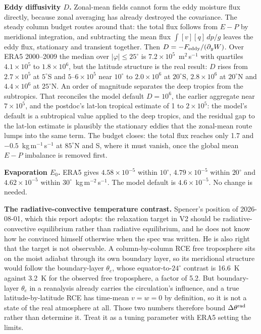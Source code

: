 \documentclass[11pt]{article}
\newcommand{\py}{\partial_y}
\begin{document}
\textbf{Eddy diffusivity $D$.} Zonal-mean fields cannot form the eddy moisture
flux directly, because zonal averaging has already destroyed the covariance.
The steady column budget routes around that: the total flux follows from
$E - P$ by meridional integration, and subtracting the mean flux
$\int [v][q]\,dp/g$ leaves the eddy flux, stationary and transient together.
Then $D = -F_{\rm eddy}/(\py W)$. Over ERA5 2000--2009 the median over
$|\varphi|\le25^\circ$ is $7.2\times10^{5}$~m$^2$\,s$^{-1}$ with quartiles
$4.1\times10^{5}$ to $1.8\times10^{6}$, but the latitude structure is the real
result: $D$ rises from $2.7\times10^{5}$ at $5^\circ$S and
$5$--$6\times10^{5}$ near $10^\circ$ to $2.0\times10^{6}$ at $20^\circ$S,
$2.8\times10^{6}$ at $20^\circ$N and $4.4\times10^{6}$ at $25^\circ$N. An order
of magnitude separates the deep
tropics from the subtropics. That reconciles the model default $D = 10^{6}$,
the earlier aggregate near $7\times10^{5}$, and the postdoc's lat-lon tropical
estimate of 1 to $2\times10^{5}$: the model's default is a subtropical value
applied to the deep tropics, and the residual gap to the lat-lon estimate is
plausibly the stationary eddies that the zonal-mean route lumps into the same
term. The budget closes: the total flux reaches only 1.7 and
$-0.5$~kg\,m$^{-1}$\,s$^{-1}$ at $85^\circ$N and S, where it must vanish, once
the global mean $E-P$ imbalance is removed first.

\textbf{Evaporation $E_0$.} ERA5 gives $4.58\times10^{-5}$ within $10^\circ$,
$4.79\times10^{-5}$ within $20^\circ$ and $4.62\times10^{-5}$ within
$30^\circ$~kg\,m$^{-2}$\,s$^{-1}$. The model default is
$4.6\times10^{-5}$. No change is needed.

\textbf{The radiative-convective temperature contrast.} Spencer's position of
2026-08-01, which this report adopts: the relaxation target in V2 should be
radiative-convective equilibrium rather than radiative equilibrium, and he does
not know how he convinced himself otherwise when the spec was written. He is
also right that the target is not observable. A column-by-column RCE free
troposphere sits on the moist adiabat through its own boundary layer, so its
meridional structure would follow the boundary-layer $\theta_e$, whose
equator-to-$24^\circ$ contrast is 16.6~K against 3.2~K for the observed
free troposphere, a factor of 5.2. But boundary-layer $\theta_e$ in a
reanalysis already carries the circulation's influence, and a true
latitude-by-latitude RCE has time-mean $v = w = 0$ by definition, so it is not
a state of the real atmosphere at all. Those two numbers therefore bound
$\Delta\theta^{\rm rad}$ rather than determine it. Treat it as a tuning
parameter with ERA5 setting the limits.
\end{document}
